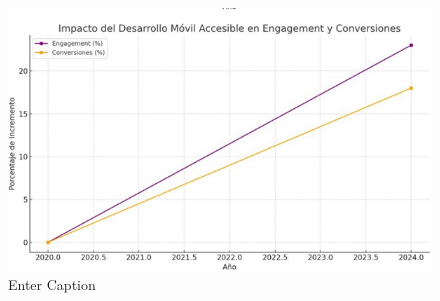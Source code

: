 \documentclass[12pt]{article}
\begin{document}
\begin{figure}
    \centering
    \includegraphics[width=0.8\linewidth]{image.png}
    \caption{Enter Caption}
    \label{fig:enter-label}
\end{figure}
\cite{blanco2009}
\cite{abrahamsson2004}
\cite{acostaespinoza2022}
\cite{balaguera2013}
\cite{beck2001}
\cite{farfan2024}
\cite{kantel2010}
\cite{pascuasrengifo2020}
\cite{pina2023}
\cite{quisaguano2022}
\cite{rios2021}
\cite{vique2019}
\printbibliography
\end{document}

